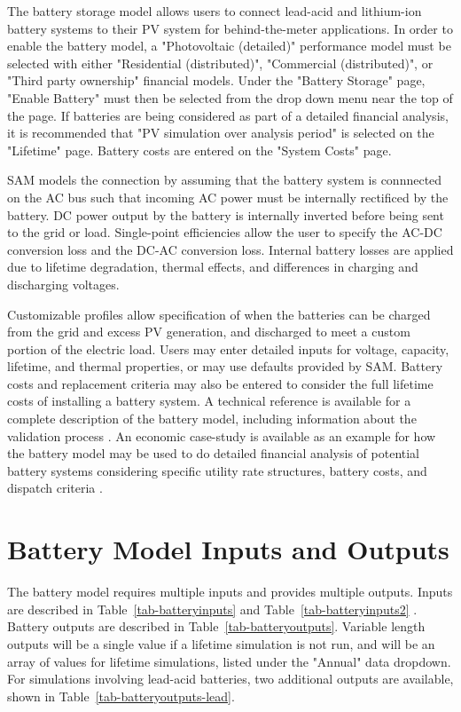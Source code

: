 \documentclass[12pt,letterpaper]{article}
\begin{document}
The battery storage model allows users to connect lead-acid and lithium-ion battery systems to their PV system for behind-the-meter applications.  In order to enable the battery model, a "Photovoltaic (detailed)" performance model must be selected with either "Residential (distributed)", "Commercial (distributed)", or "Third party ownership" financial models.  Under the "Battery Storage" page, "Enable Battery" must then be selected from the drop down menu near the top of the page.  If batteries are being considered as part of a detailed financial analysis, it is recommended that "PV simulation over analysis period" is selected on the "Lifetime" page.  Battery costs are entered on the "System Costs" page.

SAM models the connection by assuming that the battery system is connnected on the AC bus such that incoming AC power must be internally rectificed by the battery.  DC power output by the battery is internally inverted before being sent to the grid or load.  Single-point efficiencies allow the user to specify the AC-DC conversion loss and the DC-AC conversion loss.  Internal battery losses are applied due to lifetime degradation, thermal effects, and differences in charging and discharging voltages.

Customizable profiles allow specification of when the batteries can be charged from the grid and excess PV generation, and discharged to meet a custom portion of the electric load.  Users may enter detailed  inputs for voltage, capacity, lifetime, and thermal properties, or may use defaults provided by SAM.   Battery costs and replacement criteria may also be entered to consider the full lifetime costs of installing a battery system. A technical reference is available for a complete description of the battery model, including information about the validation process \citep{diorio2015a}. An economic case-study  is available as an example for how the battery model may be used to do detailed financial analysis of potential battery systems considering specific utility rate structures, battery costs, and dispatch criteria \citep{diorio2015b}.

\section{Battery Model Inputs and Outputs}\label{sec-batterymodel-inputs}
The battery model requires multiple inputs and provides multiple outputs.  Inputs are described in Table~\ref{tab-batteryinputs} and Table~\ref{tab-batteryinputs2} .  Battery outputs are described in Table~\ref{tab-batteryoutputs}.  Variable length outputs will be a single value if a lifetime simulation is not run, and will be an array of values for lifetime simulations, listed under the "Annual" data dropdown.  For simulations involving lead-acid batteries, two additional outputs are available, shown in Table~\ref{tab-batteryoutputs-lead}.  
\end{document}
